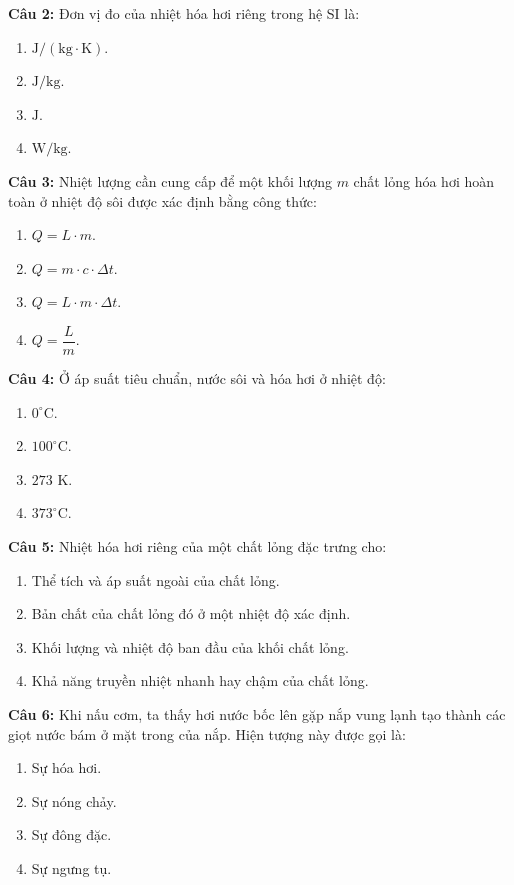 \documentclass[12pt,a4paper]{article}
\begin{document}
\textbf{Câu 2:} Đơn vị đo của nhiệt hóa hơi riêng trong hệ SI là:
\begin{enumerate}[label=\Alph*.]
  \item $\text{J}/(\text{kg}\cdot\text{K})$.
  \item $\text{J}/\text{kg}$.
  \item $\text{J}$.
  \item $\text{W}/\text{kg}$.
\end{enumerate}

\textbf{Câu 3:} Nhiệt lượng cần cung cấp để một khối lượng $m$ chất lỏng hóa hơi hoàn toàn ở nhiệt độ sôi được xác định bằng công thức:
\begin{enumerate}[label=\Alph*.]
  \item $Q = L \cdot m$.
  \item $Q = m \cdot c \cdot \Delta t$.
  \item $Q = L \cdot m \cdot \Delta t$.
  \item $Q = \dfrac{L}{m}$.
\end{enumerate}

\textbf{Câu 4:} Ở áp suất tiêu chuẩn, nước sôi và hóa hơi ở nhiệt độ:
\begin{enumerate}[label=\Alph*.]
  \item $0^{\circ}\text{C}$.
  \item $100^{\circ}\text{C}$.
  \item $273\text{ K}$.
  \item $373^{\circ}\text{C}$.
\end{enumerate}

\textbf{Câu 5:} Nhiệt hóa hơi riêng của một chất lỏng đặc trưng cho:
\begin{enumerate}[label=\Alph*.]
  \item Thể tích và áp suất ngoài của chất lỏng.
  \item Bản chất của chất lỏng đó ở một nhiệt độ xác định.
  \item Khối lượng và nhiệt độ ban đầu của khối chất lỏng.
  \item Khả năng truyền nhiệt nhanh hay chậm của chất lỏng.
\end{enumerate}

\textbf{Câu 6:} Khi nấu cơm, ta thấy hơi nước bốc lên gặp nắp vung lạnh tạo thành các giọt nước bám ở mặt trong của nắp. Hiện tượng này được gọi là:
\begin{enumerate}[label=\Alph*.]
  \item Sự hóa hơi.
  \item Sự nóng chảy.
  \item Sự đông đặc.
  \item Sự ngưng tụ.
\end{enumerate}
\end{document}

